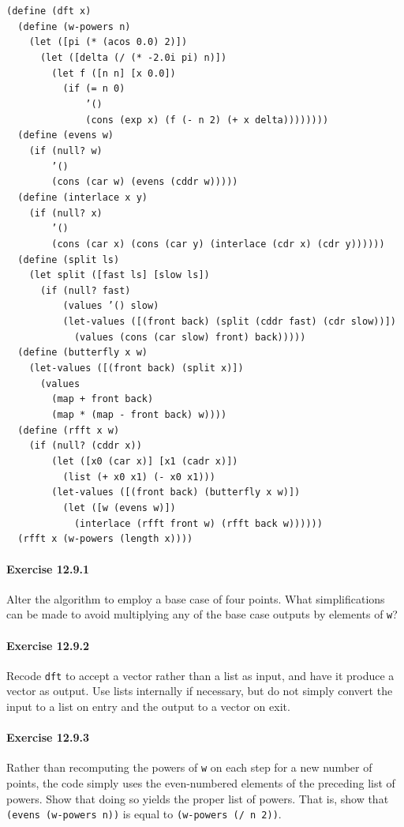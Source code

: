 \begin{alltt}
(define (dft x)
  (define (w-powers n)
    (let ([pi (* (acos 0.0) 2)])
      (let ([delta (/ (* -2.0i pi) n)])
        (let f ([n n] [x 0.0])
          (if (= n 0)
              '()
              (cons (exp x) (f (- n 2) (+ x delta))))))))
  (define (evens w)
    (if (null? w)
        '()
        (cons (car w) (evens (cddr w)))))
  (define (interlace x y)
    (if (null? x)
        '()
        (cons (car x) (cons (car y) (interlace (cdr x) (cdr y))))))
  (define (split ls)
    (let split ([fast ls] [slow ls])
      (if (null? fast)
          (values '() slow)
          (let-values ([(front back) (split (cddr fast) (cdr slow))])
            (values (cons (car slow) front) back)))))
  (define (butterfly x w)
    (let-values ([(front back) (split x)])
      (values
        (map + front back)
        (map * (map - front back) w))))
  (define (rfft x w)
    (if (null? (cddr x))
        (let ([x0 (car x)] [x1 (cadr x)])
          (list (+ x0 x1) (- x0 x1)))
        (let-values ([(front back) (butterfly x w)])
          (let ([w (evens w)])
            (interlace (rfft front w) (rfft back w))))))
  (rfft x (w-powers (length x))))
\end{alltt}

\paragraph{Exercise \label{examples_g199}12.9.1}


\label{examples_s71}Alter the algorithm to employ a base case of four points.
What simplifications can be made to avoid multiplying any of the
base case outputs by elements of \texttt{w}?


\paragraph{Exercise \label{examples_g200}12.9.2}


\label{examples_s72}Recode \texttt{dft} to accept a vector rather than a list as input, and
have it produce a vector as output.
Use lists internally if necessary, but do not simply convert the input to a
list on entry and the output to a vector on exit.


\paragraph{Exercise \label{examples_g201}12.9.3}


\label{examples_s73}Rather than recomputing the powers of \texttt{w} on each step for a new
number of points, the code simply uses the even-numbered elements of
the preceding list of powers.
Show that doing so yields the proper list of powers.
That is, show that \texttt{(evens (w-powers n))} is equal to
\texttt{(w-powers (/ n 2))}.


